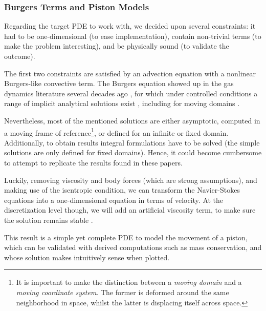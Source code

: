 \subsubsection{Burgers Terms and Piston Models}
Regarding the target PDE to work with, we decided upon several constraints:
it had to be one-dimensional (to ease implementation), 
contain non-trivial terms (to make the problem interesting),
and be physically sound (to validate the outcome).

The first two constraints are satisfied by an advection equation with 
a nonlinear Burgers-like convective term.
The Burgers equation showed up in the gas dynamics literature several decades ago
\cite{BURGERS1948171,
moran_shen_1966,
1969nonlinearWavePropagationInARelaxingGas,
1951_quasiLinearParabolicEquationOcuringAerodynamics},
for which under controlled conditions 
a range of implicit analytical solutions exist \cite{1972_TableSolutionsBurgers},
including for moving domains \cite{2000_burgersMovingDomainAnalytical}.

Nevertheless, most of the mentioned solutions are either asymptotic,
computed in a moving frame of reference\footnote{
    It is important to make the distinction between a \textit{moving domain}
    and a \textit{moving coordinate system}.
    The former is deformed around the same neighborhood in space,
    whilst the latter is displacing itself across space.
}, 
or defined for an infinite or fixed domain.
Additionally, to obtain results integral formulations have to be solved 
(the simple solutions are only defined for fixed domains).
Hence, it could become cumbersome to attempt to replicate
the results found in these papers.

Luckily, removing viscosity and body forces (which are strong assumptions), 
and making use of the isentropic condition,
we can transform the Navier-Stokes equations 
into a one-dimensional equation \cite{1860_Earnshow, nonlinearDiffusiveWaves}
in terms of velocity.
At the discretization level though, 
we will add an artificial viscosity term,
to make sure the solution remains stable \cite{2011_artificialViscosityPOD}.

This result is a simple yet complete PDE to model the movement of a piston, 
which can be validated with derived computations such as mass conservation,
and whose solution makes intuitively sense when plotted.

